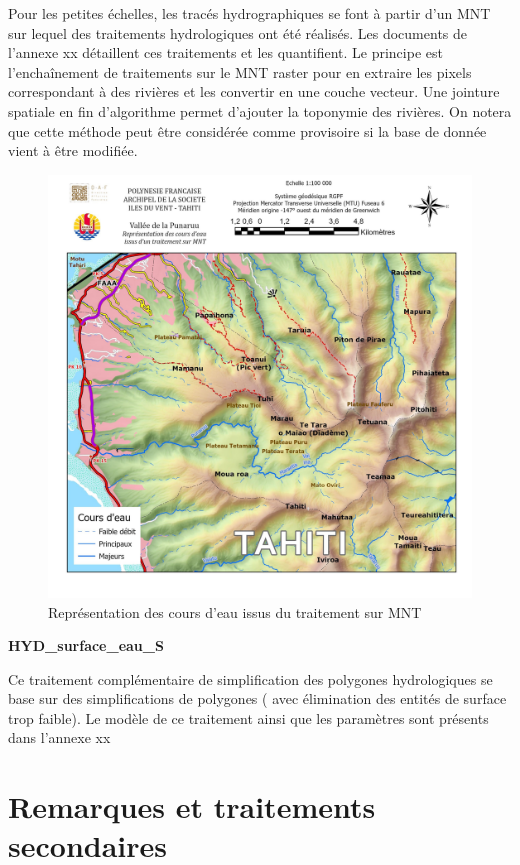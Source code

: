 Pour les petites échelles, les tracés hydrographiques se font à partir d'un MNT sur lequel des traitements hydrologiques ont été réalisés. Les documents de l'annexe xx détaillent ces traitements et les quantifient. Le principe est l'enchaînement de traitements sur le MNT raster pour en extraire les pixels correspondant à des rivières et les convertir en une couche vecteur. Une jointure spatiale en fin d'algorithme permet d'ajouter la toponymie des rivières. On notera que cette méthode peut être considérée comme provisoire si la base de donnée vient à être modifiée.

\begin{figure}[ht]
\centering
\includegraphics[scale=0.7]{images/chap1/carte_eau.jpg}
\caption{Représentation des cours d'eau issus du traitement sur MNT}
\label{carte_eau}
\end{figure}
 

\begin{center}
    \footnotesize
    \textbf{HYD\_surface\_eau\_S}
\end{center}
Ce traitement complémentaire de simplification des polygones hydrologiques se base sur des simplifications de polygones ( avec élimination des entités de surface trop faible). Le modèle de ce traitement ainsi que les paramètres sont présents dans l'annexe xx

\section{Remarques et traitements secondaires}
